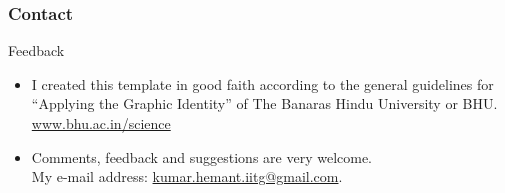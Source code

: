 \documentclass[]{beamer} %
\begin{document}
\begin{frame}[fragile]
\frametitle{Contact}
 \begin{block}{Feedback}
	\begin{itemize}
	\item I created this template in good faith according
	to the general guidelines for ``Applying the Graphic
	Identity'' of The Banaras Hindu University or  BHU.\\	
\url{www.bhu.ac.in/science}
	\item Comments, feedback and suggestions are very welcome.\\
	My e-mail address:
	\href{mailto:kumar.hemant.iitg@gmail.com}{kumar.hemant.iitg@gmail.com}.
	\end{itemize}
 \end{block}
\end{frame}
\end{document}
